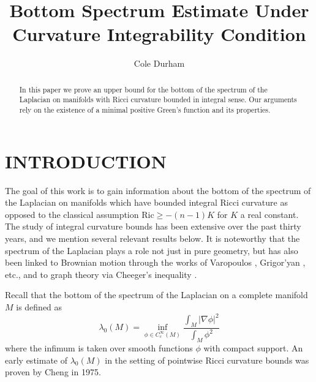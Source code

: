 \documentclass{amsart}
\theoremstyle{definition}
\theoremstyle{remark}
\numberwithin{equation}{section}
\begin{document}
\title{Bottom Spectrum Estimate Under Curvature Integrability Condition}

\author{Cole Durham}
\address{Department of Mathematics, University of Connecticut, Storrs, CT 06268, USA}


\begin{abstract}
In this paper we prove an upper bound for the bottom of the spectrum of the Laplacian on manifolds with Ricci curvature bounded in integral sense. Our arguments rely on the existence of a minimal positive Green's function and its properties.
\end{abstract}

\maketitle

\section{INTRODUCTION}
The goal of this work is to gain information about the bottom of the spectrum of the Laplacian on manifolds which have bounded integral Ricci curvature as opposed to the classical assumption $\text{Ric} \geq -(n-1)K$ for $K$ a real constant. The study of integral curvature bounds has been extensive over the past thirty years, and we mention several relevant results below. It is noteworthy that the spectrum of the Laplacian plays a role not just in pure geometry, but has also been linked to Brownian motion through the works of Varopoulos \cite{Var}, Grigor'yan \cite{AG}, etc., and to graph theory via Cheeger's inequality \cite{d63036efc9d24f07b8908864667e28aa}.

Recall that the bottom of the spectrum of the Laplacian on a complete manifold $M$ is defined as
\begin{equation*}
\lambda_0(M) = \inf_{\phi\in C_c^{\infty}(M)}\frac{\int_M|\nabla \phi|^2}{\int_M\phi^2}
\end{equation*}
where the infimum is taken over smooth functions $\phi$ with compact support. An early estimate of $\lambda_0(M)$ in the setting of pointwise Ricci curvature bounds was proven by Cheng \cite{cheng} in 1975.
\end{document}
